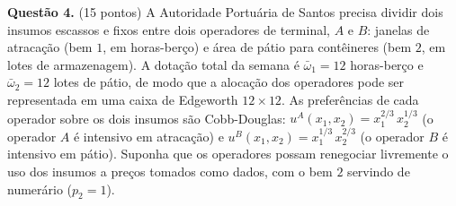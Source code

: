 \textbf{Questão 4.} (15 pontos) A Autoridade Portuária de Santos precisa dividir dois insumos escassos e fixos entre dois operadores de terminal, $A$ e $B$: janelas de atracação (bem $1$, em horas-berço) e área de pátio para contêineres (bem $2$, em lotes de armazenagem). A dotação total da semana é $\bar\omega_1 = 12$ horas-berço e $\bar\omega_2 = 12$ lotes de pátio, de modo que a alocação dos operadores pode ser representada em uma caixa de Edgeworth $12\times 12$. As preferências de cada operador sobre os dois insumos são Cobb-Douglas: $u^A(x_1,x_2) = x_1^{2/3}\,x_2^{1/3}$ (o operador $A$ é intensivo em atracação) e $u^B(x_1,x_2) = x_1^{1/3}\,x_2^{2/3}$ (o operador $B$ é intensivo em pátio). Suponha que os operadores possam renegociar livremente o uso dos insumos a preços tomados como dados, com o bem $2$ servindo de numerário ($p_2 = 1$).

